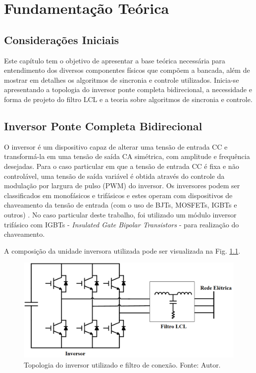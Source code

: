 \chapter{Fundamentação Teórica}

\section{Considerações Iniciais}

Este capítulo tem o objetivo de apresentar a base teórica necessária para entendimento dos diversos componentes físicos que compõem a bancada,
além de mostrar em detalhes os algoritmos de sincronia e controle utilizados.
Inicia-se apresentando a topologia do inversor ponte completa bidirecional, a necessidade e forma de projeto do filtro LCL e a teoria sobre algoritmos de sincronia e controle.

\section{Inversor Ponte Completa Bidirecional}

O inversor é um dispositivo capaz de alterar uma tensão de entrada CC e transformá-la em uma tensão de saída CA simétrica, com amplitude e frequência desejadas. Para o caso particular em que a tensão de entrada CC é fixa e não controlável, uma tensão de saída variável é obtida através do controle da modulação por largura de pulso (PWM) do inversor. Os inversores podem ser classificados em monofásicos e trifásicos e estes operam com dispositivos de chaveamento da tensão de entrada (com o uso de BJTs, MOSFETs, IGBTs e outros) \cite{MRashid}. No caso particular deste trabalho, foi utilizado um módulo inversor trifásico com IGBTs - \textit{Insulated Gate Bipolar Transistors} - para realização do chaveamento. 

A composição da unidade inversora utilizada pode ser visualizada na Fig. \ref{fig:Inversor}.

\begin{figure}[!hbt]
	\begin{center}
		\includegraphics[scale=0.5]{figuras/Inversor.png}
		\caption{Topologia do inversor utilizado e filtro de conexão. Fonte: Autor.}
		\label{fig:Inversor}
	\end{center}
\end{figure}


